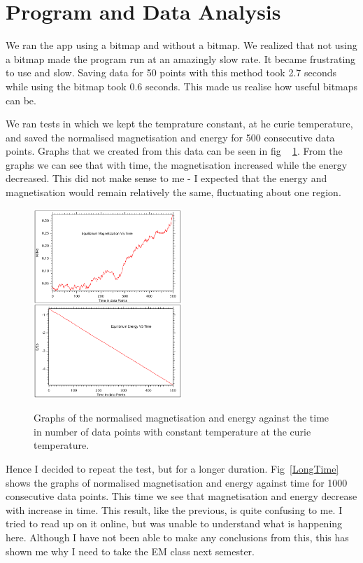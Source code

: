 \documentclass{article}
\begin{document}
\section{Program and Data Analysis } 

We ran the app using a bitmap and without a bitmap. We realized that not using a bitmap made the program run at an amazingly slow rate. It became frustrating to use and slow. Saving data for 50 points with this method took 2.7 seconds while using the bitmap took 0.6 seconds. This made us realise how useful bitmaps can be. 

We ran tests in which we kept the temprature constant, at he curie temperature, and saved the normalised magnetisation and energy for 500 consecutive data points. Graphs that we created from this data can be seen in fig ~ \ref{Time}. From the graphs we can see that with time, the magnetisation increased while the energy decreased. This did not make sense to me - I expected that the energy and magnetisation would remain relatively the same, fluctuating about one region. 

  
  \begin{figure}[h]
  	\caption{Graphs of the normalised magnetisation and energy against the time in number of data points with constant temperature at the curie temperature.}
  	\centering
  	\includegraphics[width=0.5\textwidth]{Time} \label{Time}
  \end{figure}
  
  



Hence I decided to repeat the test, but for a longer duration. Fig~\ref{LongTime} shows the graphs of normalised magnetisation and energy against time for 1000 consecutive data points. This time we see that magnetisation and energy decrease with increase in time. This result, like the previous, is quite confusing to me. I tried to read up on it online, but was unable to understand what is happening here. Although I have not been able to make any conclusions from this, this has shown me why I need to take the EM class next semester. 
\end{document}
